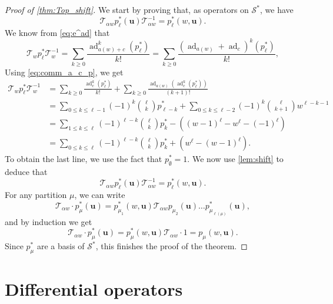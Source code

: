\documentclass[12pt]{amsart}
\theoremstyle{remark}
\newcommand{\bfu}{\boldsymbol{u}}
\newcommand{\Top}{\mathcal{T}}
\DeclareMathOperator{\ad}{ad}
\newcommand{\mcSstar}{\mathcal{S}^*}
\begin{document}
\begin{proof}[Proof of \cref{thm:Top_shift}]
We start by proving that, as operators on $\mcSstar$, we have
    \begin{equation}\label{eq:item2}
      \Top_{\alpha w} p^*_\ell(\bfu) \Top_{\alpha w}^{-1}=p_\ell^*(w,\bfu).  
    \end{equation}
We know from \cref{eq:e^ad} that
\begin{equation}\label{eq:conj_A}
  \Top_w p^*_\ell \Top_w^{-1}=\sum_{k\geq 0}\frac{\ad_{a(w)+c}^k(p^*_\ell)}{k!}=\sum_{k\geq 0}\frac{\left(\ad_{a(w)}+\ad_{c}\right)^k(p^*_\ell)}{k!},  
\end{equation}
Using \cref{eq:comm_a_c_p}, we get
\begin{align*}
  \Top_w p^*_\ell \Top_w^{-1}
  &=\sum_{k\geq 0}\frac{\ad_{c}^k(p^*_\ell)}{k!}+\sum_{k\geq 0}\frac{\ad_{a(w)}\left(\ad_{c}^k(p^*_\ell)\right)}{(k+1)!}\\
  &=\sum_{0\leq k\leq \ell-1}(-1)^{k}\binom{\ell}{k}p^*_{\ell-k}+
  \sum_{0\leq k\leq \ell-2}(-1)^{k}\binom{\ell}{k+1}w^{\ell-k-1}\\
&=\sum_{1\leq k\leq \ell}(-1)^{\ell-k}\binom{\ell}{k}p^*_{k}-\left((w-1)^{\ell}-w^{\ell}-(-1)^{\ell}\right)\\
&=\sum_{0\leq k\leq \ell}(-1)^{\ell-k}\binom{\ell}{k}p^*_{k}+\left(w^{\ell}-(w-1)^{\ell}\right).
\end{align*}
To obtain the last line, we use the fact that $p_\emptyset^*=1$.
    We now use \cref{lem:shift} to deduce that
    $$\Top_{\alpha w} p^*_\ell(\bfu) \Top_{\alpha w}^{-1}=p^*_\ell(w,\bfu).$$
For any partition $\mu$, we can write
$$\Top_{\alpha w}\cdot p^*_\mu(\bfu)=p^*_{\mu_1}(w,\bfu)\Top_{\alpha w}p_{\mu_2}(\bfu)\dots p^*_{\mu_{\ell(\mu)}}(\bfu),$$
and by induction we get
$$\Top_{\alpha w}\cdot p^*_\mu(\bfu)=p^*_{\mu}(w,\bfu)\Top_{\alpha w}\cdot 1=p_{\mu}(w,\bfu).$$
Since $p_\mu^*$ are a basis of $\mcSstar$, this finishes the proof of the theorem. 
\end{proof}





\section{Differential operators}\label{sec:diff_operators}
\end{document}
